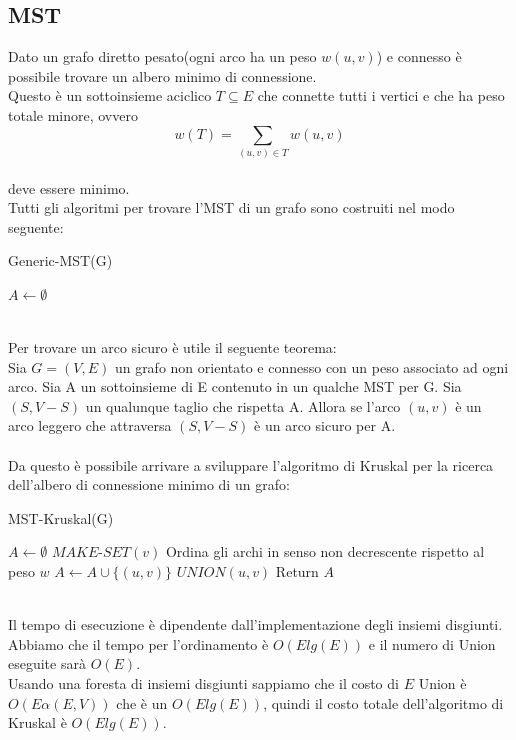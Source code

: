 \documentclass[]{article}
\begin{document}
\subsection{MST}
Dato un grafo diretto pesato(ogni arco ha un peso $w(u,v)$) e connesso è possibile trovare un albero minimo di connessione.\\
Questo è un sottoinsieme aciclico $T\subseteq E$ che connette tutti i vertici e che ha peso totale minore, ovvero\\
$$w(T) = \sum_{(u,v)\in T} w(u,v)$$ \\
deve essere minimo.\\
Tutti gli algoritmi per trovare l'MST di un grafo sono costruiti nel modo seguente:
\begin{algorithm}
\caption{Generic-MST(G)}
\begin{algorithmic}[1]
\STATE $A \leftarrow \emptyset$
\ENDWHILE
\end{algorithmic}
\end{algorithm}
\\
Per trovare un arco sicuro è utile il seguente teorema:\\
Sia $G=(V,E)$ un grafo non orientato e connesso con un peso associato ad ogni arco. Sia A un sottoinsieme di E contenuto in un qualche MST per G. Sia $(S, V-S)$ un qualunque taglio che rispetta A. Allora se l'arco $(u,v)$ è un arco leggero che attraversa $(S, V-S)$ è un arco sicuro per A.\\\\
Da questo è possibile arrivare a sviluppare l'algoritmo di Kruskal per la ricerca dell'albero di connessione minimo di un grafo:
\begin{algorithm}
\caption{MST-Kruskal(G)}
\begin{algorithmic}[1]
\STATE $A \leftarrow \emptyset$
	\STATE $MAKE\mbox{-}SET(v)$
\ENDFOR 
\STATE Ordina gli archi in senso non decrescente rispetto al peso $w$
		\STATE $A \leftarrow A \cup \{(u,v)\}$
		\STATE $UNION(u,v)$	
	\ENDIF
\ENDFOR
\STATE Return $A$
\end{algorithmic}
\end{algorithm}
\\
Il tempo di esecuzione è dipendente dall'implementazione degli insiemi disgiunti.\\
Abbiamo che il tempo per l'ordinamento è $O(Elg(E))$ e il numero di Union eseguite sarà $O(E)$.\\
Usando una foresta di insiemi disgiunti sappiamo che il costo di $E$ Union è $O(E\alpha(E,V))$ che è un $O(Elg(E))$, quindi il costo totale dell'algoritmo di Kruskal è $O(Elg(E))$.
\end{document}
